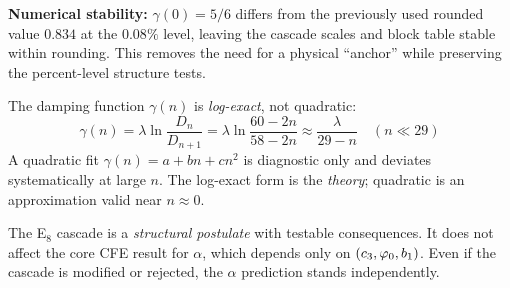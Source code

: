 \begin{remark}
\textbf{Numerical stability:} $\gamma(0)=5/6$ differs from the previously used rounded value $0.834$ at the $0.08\%$ level, leaving the cascade scales and block table stable within rounding. 
This removes the need for a physical ``anchor'' while preserving the percent-level structure tests.
\end{remark}

\begin{tcolorbox}[colback=blue!3, colframe=blue!40, 
    title={\textbf{Lemma (Log-Exact vs.\ Quadratic)}}, fonttitle=\bfseries\small]
The damping function $\gamma(n)$ is \emph{log-exact}, not quadratic:
\begin{equation}
    \gamma(n) = \lambda \ln\frac{D_n}{D_{n+1}} = \lambda \ln\frac{60-2n}{58-2n} 
    \approx \frac{\lambda}{29-n} \quad (n \ll 29)
\end{equation}
A quadratic fit $\gamma(n) = a + bn + cn^2$ is diagnostic only and deviates 
systematically at large $n$. The log-exact form is the \emph{theory}; quadratic 
is an approximation valid near $n \approx 0$.
\end{tcolorbox}

\begin{remark}
The E$_8$ cascade is a \emph{structural postulate} with testable consequences. 
It does not affect the core CFE result for $\alpha$, which depends only on 
$(c_3, \varphi_0, b_1)$. Even if the cascade is modified or rejected, the 
$\alpha$ prediction stands independently.
\end{remark}

